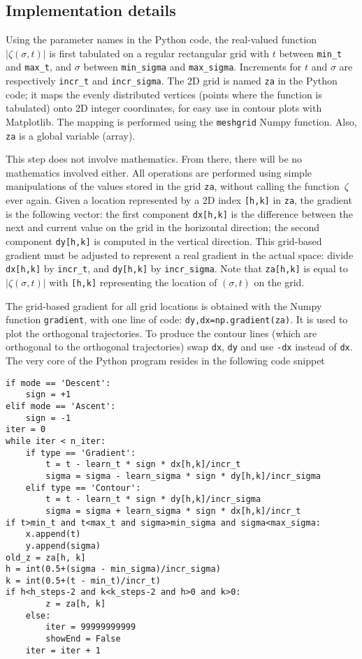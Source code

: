 \documentclass[oneside,10pt]{book}
\begin{document}
\subsection{Implementation details}\label{porbug}

Using the parameter names in the Python code,
the real-valued function $|\zeta(\sigma, t)|$ is first tabulated on a regular rectangular grid with $t$ between
\texttt{min\_t} and \texttt{max\_t}, and $\sigma$ between \texttt{min\_sigma} and \texttt{max\_sigma}. Increments for
 $t$ and $\sigma$ are respectively \texttt{incr\_t} and \texttt{incr\_sigma}. The 2D grid is named \texttt{za} in the Python code;
 it maps the evenly distributed vertices (points where the function is tabulated) onto 2D integer coordinates,  for easy use in contour plots with Matplotlib.
 The mapping is performed using the \texttt{meshgrid} Numpy function. Also, \texttt{za} is a global variable (array).

This step does not involve mathematics. From there, there will be no mathematics involved either. All operations are performed using simple manipulations of the values stored in the grid \texttt{za}, without calling the function~$\zeta$ ever again. Given
 a location represented by a 2D index \texttt{[h,k]} in \texttt{za}, the gradient is  the following vector: the first component \texttt{dx[h,k]} is the difference between the next and current value on the grid in the horizontal direction; the second component \texttt{dy[h,k]} is computed in the vertical direction. This grid-based gradient must be
 adjusted to represent a real gradient in the actual space: divide \texttt{dx[h,k]} by \texttt{incr\_t}, and \texttt{dy[h,k]} by \texttt{incr\_sigma}.
Note that \texttt{za[h,k]} is equal to $|\zeta(\sigma, t)|$ with \texttt{[h,k]} representing the location of $(\sigma, t)$ on the grid.

The grid-based gradient for all grid locations is obtained with the Numpy function \texttt{gradient}, with one line of code: \texttt{dy,dx=np.gradient(za)}. It is used to plot the orthogonal trajectories. To produce the contour lines (which are orthogonal to the orthogonal trajectories)
 swap \texttt{dx}, \texttt{dy} and use \texttt{-dx} instead of \texttt{dx}. The very core of the Python program resides in the following code snippet \vspace{1ex}

\begin{lstlisting}
if mode == 'Descent':
    sign = +1
elif mode == 'Ascent':
    sign = -1
iter = 0
while iter < n_iter:
    if type == 'Gradient':
        t = t - learn_t * sign * dx[h,k]/incr_t
        sigma = sigma - learn_sigma * sign * dy[h,k]/incr_sigma
    elif type == 'Contour':
        t = t - learn_t * sign * dy[h,k]/incr_sigma
        sigma = sigma + learn_sigma * sign * dx[h,k]/incr_t
if t>min_t and t<max_t and sigma>min_sigma and sigma<max_sigma:
    x.append(t)
    y.append(sigma)
old_z = za[h, k]
h = int(0.5+(sigma - min_sigma)/incr_sigma)
k = int(0.5+(t - min_t)/incr_t)
if h<h_steps-2 and k<k_steps-2 and h>0 and k>0:
        z = za[h, k]
    else:
        iter = 99999999999
        showEnd = False
    iter = iter + 1
\end{lstlisting}\vspace{1ex}
\end{document}
